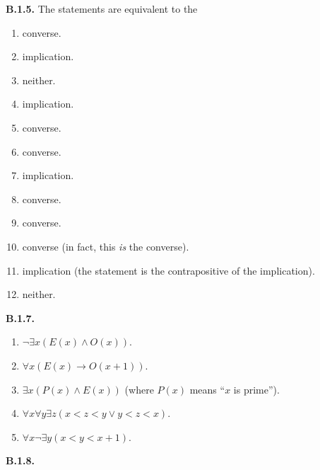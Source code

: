 \documentclass[10pt,]{book}
\theoremstyle{plain}
\theoremstyle{definition}
\theoremstyle{definition}
\theoremstyle{definition}
\theoremstyle{definition}
\numberwithin{equation}{chapter}
\def\imp{\rightarrow}
\newcommand{\lt}{<}
\begin{document}
%
\par\smallskip
\noindent\textbf{B.1.5.} \hypertarget{p-1508}{}%
The statements are equivalent to the\textellipsis{} \leavevmode%
\begin{enumerate}[label=(\alph*)]
\item\hypertarget{li-369}{}\hypertarget{p-1509}{}%
converse.%
\item\hypertarget{li-370}{}\hypertarget{p-1510}{}%
implication.%
\item\hypertarget{li-371}{}\hypertarget{p-1511}{}%
neither.%
\item\hypertarget{li-372}{}\hypertarget{p-1512}{}%
implication.%
\item\hypertarget{li-373}{}\hypertarget{p-1513}{}%
converse.%
\item\hypertarget{li-374}{}\hypertarget{p-1514}{}%
converse.%
\item\hypertarget{li-375}{}\hypertarget{p-1515}{}%
implication.%
\item\hypertarget{li-376}{}\hypertarget{p-1516}{}%
converse.%
\item\hypertarget{li-377}{}\hypertarget{p-1517}{}%
converse.%
\item\hypertarget{li-378}{}\hypertarget{p-1518}{}%
converse (in fact, this \emph{is} the converse).%
\item\hypertarget{li-379}{}\hypertarget{p-1519}{}%
implication (the statement is the contrapositive of the implication).%
\item\hypertarget{li-380}{}\hypertarget{p-1520}{}%
neither.%
\end{enumerate}
%
\par\smallskip
\noindent\textbf{B.1.7.} \hypertarget{p-1529}{}%
\leavevmode%
\begin{enumerate}[label=(\alph*)]
\item\hypertarget{li-386}{}\(\neg \exists x (E(x) \wedge O(x))\).%
\item\hypertarget{li-387}{}\(\forall x (E(x) \imp O(x+1))\).%
\item\hypertarget{li-388}{}\(\exists x(P(x) \wedge E(x))\) (where \(P(x)\) means ``\(x\) is prime'').%
\item\hypertarget{li-389}{}\(\forall x \forall y \exists z(x \lt  z \lt  y \vee y \lt  z \lt  x)\).%
\item\hypertarget{li-390}{}\(\forall x \neg \exists y (x \lt  y \lt  x+1)\).%
\end{enumerate}
%
\par\smallskip
\noindent\textbf{B.1.8.} \hypertarget{p-1531}{}%
\leavevmode%
\end{document}
